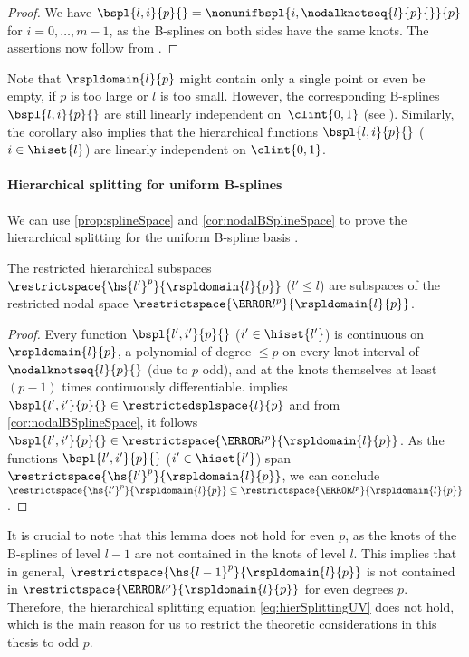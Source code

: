 \begin{proof}
  We have $\bspl{l,i}{p}{} = \nonunifbspl{i,\nodalknotseq{l}{p}{}}{p}$ for
  $i = 0, \dotsc, m - 1$,
  as the B-splines on both sides have the same knots.
  The assertions now follow from .
\end{proof}

Note that $\rspldomain{l}{p}$ might contain only a single point or even be empty,
if $p$ is too large or $l$ is too small.
However, the corresponding B-splines $\bspl{l,i}{p}{}$ are still linearly
independent on~$\clint{0, 1}$ (see \cite{Hoellig13Approximation}).
Similarly, the corollary also implies that the hierarchical functions
$\bspl{l,i}{p}{}$ ($i \in \hiset{l}$) are linearly independent on $\clint{0, 1}$.

\paragraph{Hierarchical splitting for uniform B-splines}

We can use \cref{prop:splineSpace} and \cref{cor:nodalBSplineSpace}
to prove the hierarchical splitting for the uniform B-spline basis
\cite{Valentin16Hierarchical}.

\begin{lemma}
  The restricted hierarchical subspaces
  $\restrictspace{\hs{l'}^p}{\rspldomain{l}{p}}$ ($l' \le l$) are
  subspaces of the restricted nodal space $\restrictspace{\ns{l}^p}{\rspldomain{l}{p}}$.
\end{lemma}

\begin{proof}
  Every function $\bspl{l',i'}{p}{}$ ($i' \in \hiset{l'}$) is continuous on
  $\rspldomain{l}{p}$, a polynomial of degree $\le p$ on every knot interval
  of $\nodalknotseq{l}{p}{}$ (due to $p$ odd),
  and at the knots themselves at least $(p - 1)$ times continuously
  differentiable.
   implies $\bspl{l',i'}{p}{} \in \restrictedsplspace{l}{p}$
  and from \cref{cor:nodalBSplineSpace}, it follows
  $\bspl{l',i'}{p}{} \in \restrictspace{\ns{l}^p}{\rspldomain{l}{p}}$.
  As the functions $\bspl{l',i'}{p}{}$ ($i' \in \hiset{l'}$) span
  $\restrictspace{\hs{l'}^p}{\rspldomain{l}{p}}$, we can conclude
  $\restrictspace{\hs{l'}^p}{\rspldomain{l}{p}} \subset \restrictspace{\ns{l}^p}{\rspldomain{l}{p}}$.
\end{proof}

It is crucial to note that this lemma does not hold for even $p$,
as the knots of the B-splines of level $l - 1$ are not contained in the
knots of level $l$.
This implies that in general,
$\restrictspace{\hs{l-1}^p}{\rspldomain{l}{p}}$ is not contained in $\restrictspace{\ns{l}^p}{\rspldomain{l}{p}}$
for even degrees $p$.
Therefore, the hierarchical splitting equation \eqref{eq:hierSplittingUV}
does not hold, which is the main reason for us to restrict the
theoretic considerations in this thesis to odd $p$.

